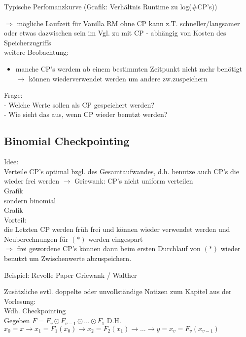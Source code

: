 Typische Perfomanzkurve (Grafik: Verhältnis Runtime zu log(\#CP's))\\
\vspace{3cm}

$\Rightarrow$ mögliche Laufzeit für Vanilla RM ohne CP kann z.T. schneller/langsamer oder etwas dazwischen sein im Vgl. zu mit CP - abhängig von Kosten des Speicherzugriffs\\

\noindent weitere Beobachtung:
\begin{itemize}
	\item manche CP's werdem ab einem bestimmten Zeitpunkt nicht mehr benötigt $\rightarrow$ können wiederverwendet werden um andere zw.zuspeichern
\end{itemize}
Frage:\\
- Welche Werte sollen als CP gespeichert werden?\\
- Wie sieht das aus, wenn CP wieder benutzt werden?

\subsection{Binomial Checkpointing}
Idee:\\
Verteile CP's optimal bzgl. des Gesamtaufwandes, d.h. benutze auch CP's die wieder frei werden
$\rightarrow$ Griewank: CP's nicht uniform verteilen\\
Grafik\\
sondern binomial\\
Grafik\\

Vorteil:\\
die Letzten CP werden früh frei und können wieder verwendet werden und Neuberechnungen für $(*)$ werden eingespart\\
$\Rightarrow$ frei gewordene CP's können dann beim ersten Durchlauf von $(*)$ wieder benutzt um Zwischenwerte abzuspeichern.

Beispiel: Revolle Paper Griewank / Walther







\noindent\makebox[\linewidth]{\rule{\paperwidth}{0.4pt}}
Zusätzliche evtl. doppelte oder unvollständige Notizen zum Kapitel aus der Vorlesung:\\

Wdh. Checkpointing\\
Gegeben $F = F_v \odot F_{v-1} \odot \dots \odot F_1$ D.H.
$x_0 = x \rightarrow x_1 = F_1(x_0) \rightarrow x_2 = F_2(x_1) \rightarrow \dots \rightarrow y= x_v = F_v(x_{v-1})$

